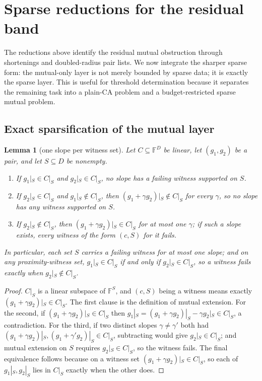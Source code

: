 \documentclass[11pt]{amsart}
\newtheorem{lemma}[lemma]{Lemma}
\theoremstyle{definition}
\theoremstyle{remark}
\newcommand{\F}{\mathbb{F}}
\begin{document}
\section{Sparse reductions for the residual band}\label{sec:sparse-band}

The reductions above identify the residual mutual obstruction through shortenings and doubled-radius pair lists.  We now integrate the sharper sparse form: the mutual-only layer is not merely bounded by sparse data; it is exactly the sparse layer.  This is useful for threshold determination because it separates the remaining task into a plain-CA problem and a budget-restricted sparse mutual problem.

\subsection{Exact sparsification of the mutual layer}

\begin{lemma}[one slope per witness set]\label{lem:line}
Let $C\subseteq\F^D$ be linear, let $(g_1,g_2)$ be a pair, and let $S\subseteq D$ be nonempty.
\begin{enumerate}
\item If $g_1|_S\in C|_S$ and $g_2|_S\in C|_S$, no slope has a failing witness supported on $S$.
\item If $g_2|_S\in C|_S$ and $g_1|_S\notin C|_S$, then $(g_1+\gamma g_2)|_S\notin C|_S$ for every $\gamma$, so no slope has any witness supported on $S$.
\item If $g_2|_S\notin C|_S$, then $(g_1+\gamma g_2)|_S\in C|_S$ for at most one $\gamma$; if such a slope exists, every witness of the form $(c,S)$ for it fails.
\end{enumerate}
In particular, each set $S$ carries a failing witness for at most one slope; and on any proximity-witness set, $g_1|_S\in C|_S$ if and only if $g_2|_S\in C|_S$, so a witness fails exactly when $g_2|_S\notin C|_S$.
\end{lemma}

\begin{proof}
$C|_S$ is a linear subspace of $\F^S$, and $(c,S)$ being a witness means exactly $(g_1+\gamma g_2)|_S\in C|_S$.  The first clause is the definition of mutual extension.  For the second, if $(g_1+\gamma g_2)|_S\in C|_S$ then $g_1|_S=(g_1+\gamma g_2)|_S-\gamma g_2|_S\in C|_S$, a contradiction.  For the third, if two distinct slopes $\gamma\ne\gamma'$ both had $(g_1+\gamma g_2)|_S,(g_1+\gamma' g_2)|_S\in C|_S$, subtracting would give $g_2|_S\in C|_S$; and mutual extension on $S$ requires $g_2|_S\in C|_S$, so the witness fails.  The final equivalence follows because on a witness set $(g_1+\gamma g_2)|_S\in C|_S$, so each of $g_1|_S,g_2|_S$ lies in $C|_S$ exactly when the other does.
\end{proof}
\end{document}
